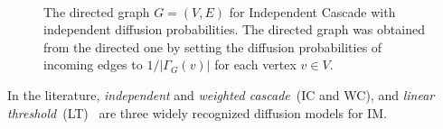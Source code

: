 \documentclass[10pt,journal,compsoc]{IEEEtran}
\begin{document}
\begin{figure}[!ht] 
    \centering
    \\%
  \caption{\protect{} 
The directed graph $G = (V, E)$ for Independent Cascade with independent diffusion probabilities. 
\protect{}
The directed graph was obtained from the directed one by setting the diffusion probabilities of incoming edges to $1 / |\Gamma_G(v)|$ for each vertex $v \in V$. 
  }
  \label{fig:xx} 
\end{figure}
In the literature, {\em independent} and {\em weighted cascade}~(IC and WC), and 
{\em linear threshold}~(LT)~\cite{kempe2003maximizing} are three widely recognized diffusion models for IM. 
\end{document}
